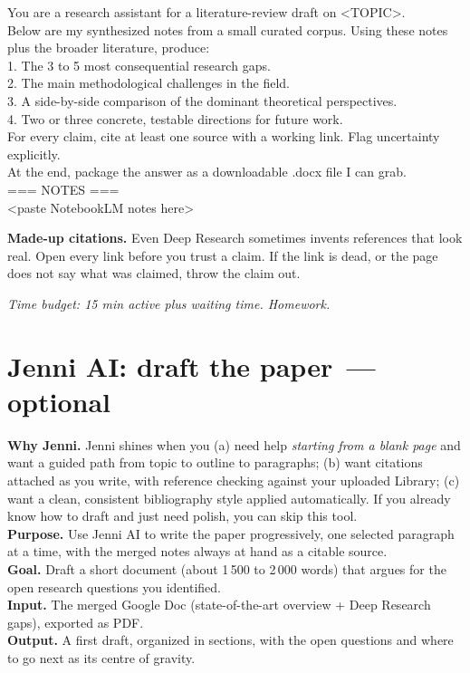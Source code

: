 \documentclass[11pt,a4paper]{article}
\begin{document}
\begin{promptbox}
You are a research assistant for a literature-review draft on <TOPIC>.\\
Below are my synthesized notes from a small curated corpus. Using these notes plus the broader literature, produce:\\
1. The 3 to 5 most consequential research gaps.\\
2. The main methodological challenges in the field.\\
3. A side-by-side comparison of the dominant theoretical perspectives.\\
4. Two or three concrete, testable directions for future work.\\
For every claim, cite at least one source with a working link. Flag uncertainty explicitly.\\
At the end, package the answer as a downloadable .docx file I can grab.\\[4pt]
=== NOTES ===\\
<paste NotebookLM notes here>
\end{promptbox}

\begin{watchout}
\textbf{Made-up citations.} Even Deep Research sometimes invents references that look real. Open every link before you trust a claim. If the link is dead, or the page does not say what was claimed, throw the claim out.
\end{watchout}

\textit{Time budget: 15 min active plus waiting time. Homework.}

\section[Jenni AI: draft the paper (optional)]{Jenni AI: draft the paper \textnormal{\normalsize\textcolor{accent!70!black}{\,---\,optional}}}
\label{sec:jenni}

\begin{toolheader}
\textbf{Why Jenni.} Jenni shines when you (a) need help \emph{starting from a blank page} and want a guided path from topic to outline to paragraphs; (b) want citations attached as you write, with reference checking against your uploaded Library; (c) want a clean, consistent bibliography style applied automatically. If you already know how to draft and just need polish, you can skip this tool.\\
\textbf{Purpose.} Use Jenni AI to write the paper progressively, one selected paragraph at a time, with the merged notes always at hand as a citable source.\\
\textbf{Goal.} Draft a short document (about 1\,500 to 2\,000 words) that argues for the open research questions you identified.\\
\textbf{Input.} The merged Google Doc (state-of-the-art overview + Deep Research gaps), exported as PDF.\\
\textbf{Output.} A first draft, organized in sections, with the open questions and where to go next as its centre of gravity.
\end{toolheader}
\end{document}
